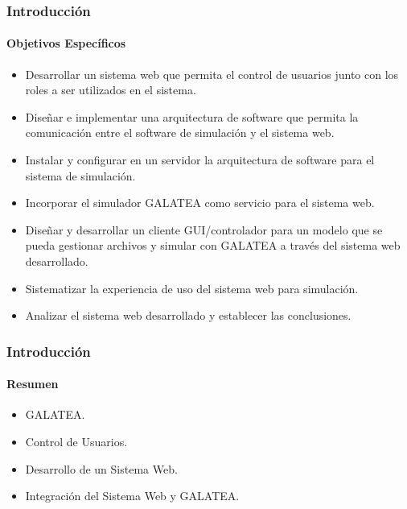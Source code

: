 \documentclass[spanish,xcolor=dvipsnames]{beamer}
\begin{document}
    \begin{frame}
    	\frametitle{Introducción}
    	\framesubtitle{Objetivos Específicos}
    	
    	\begin{itemize}
    		\item Desarrollar un sistema web que permita el control de usuarios junto con los roles a ser utilizados en el sistema.
    		\item Diseñar e implementar una arquitectura de software que permita la comunicación entre el software de simulación y el sistema web.
    		\item Instalar y configurar en un servidor la arquitectura de software para el sistema de simulación.
    		\item Incorporar el simulador GALATEA como servicio para el sistema web.
    		\item Diseñar y desarrollar un cliente GUI/controlador para un modelo que se pueda gestionar archivos y simular con GALATEA a través del sistema web desarrollado.
    		\item Sistematizar la experiencia de uso del sistema web para simulación.
    		\item Analizar el sistema web desarrollado y establecer las conclusiones.
    	\end{itemize}
    	
    \end{frame}
    \begin{frame}
    	\frametitle{Introducción}
    	\framesubtitle{Resumen}
    	
    	\begin{itemize}
    		\item GALATEA.
    		\item Control de Usuarios.
    		\item Desarrollo de un Sistema Web.
    		\item Integración del Sistema Web y GALATEA.
    	\end{itemize}
    	
    \end{frame}
    
\end{document}
